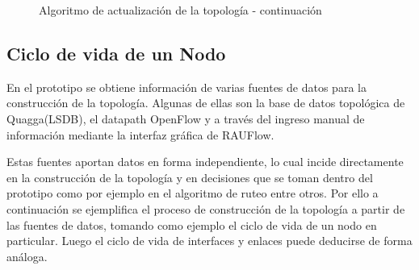 \newpage
\clearpage
\begin{figure}[ht!]
\begin{algorithm}[H]
 
\end{algorithm}
\caption[]{Algoritmo de actualización de la topolog\'ia - continuaci\'on}
\end{figure}

\subsection{Ciclo de vida de un Nodo}
En el prototipo se obtiene informaci\'on de varias fuentes de datos para la construcci\'on de la topolog\'ia. Algunas de ellas son la base de datos topol\'ogica de Quagga(LSDB), el datapath OpenFlow y a través del ingreso manual de informaci\'on mediante la interfaz gr\'afica de RAUFlow.

Estas fuentes aportan datos en forma independiente, lo cual incide directamente en la construcci\'on de la topolog\'ia y en decisiones que se toman dentro del prototipo como por ejemplo en el algoritmo de ruteo entre otros. Por ello a continuaci\'on se ejemplifica el proceso de construcci\'on de la topolog\'ia a partir de las fuentes de datos, tomando como ejemplo el ciclo de vida de un nodo en particular. Luego el ciclo de vida de interfaces y enlaces puede deducirse de forma análoga.\\

